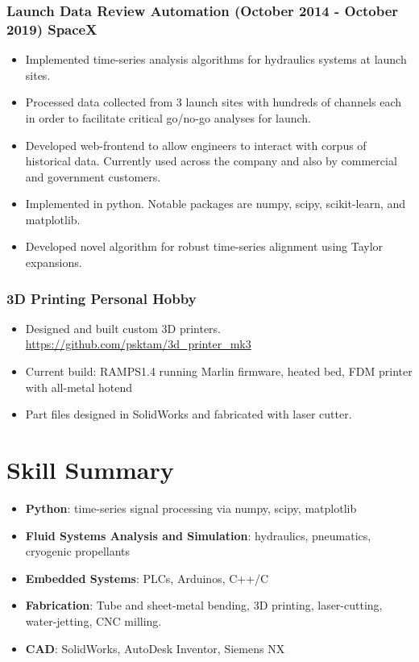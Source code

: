 \documentclass[11pt]{article}
\begin{document}
    \subsubsection*{Launch Data Review Automation
                    (October 2014 - October 2019) \hfill SpaceX}
        \begin{itemize}
            \setlength\itemsep{-0.5em}
            \item Implemented time-series analysis algorithms for hydraulics
                  systems at launch sites.
            \item Processed data collected from 3 launch sites with hundreds
                  of channels each in order to facilitate critical go/no-go
                  analyses for launch.
            \item Developed web-frontend to allow engineers to interact with
                  corpus of historical data. Currently used across the company
                  and also by commercial and government customers.
            \item Implemented in python. Notable packages are
                  numpy, scipy, scikit-learn, and matplotlib.
            \item Developed novel algorithm for robust time-series alignment 
                  using Taylor expansions.
        \end{itemize}

\subsubsection*{3D Printing \hfill Personal Hobby}
    \begin{itemize}
        \setlength\itemsep{-0.5em}
        \item  Designed and built custom 3D printers.
               \url{https://github.com/psktam/3d_printer_mk3}
        \item Current build: RAMPS1.4 running Marlin firmware, heated bed,
              FDM printer with all-metal hotend
        \item Part files designed in SolidWorks and fabricated with laser
              cutter.
    \end{itemize}

\section*{Skill Summary}
    \begin{itemize}
        \setlength\itemsep{-0.5em}
        \item \textbf{Python}: time-series signal processing via numpy, scipy,      
              matplotlib
        \item \textbf{Fluid Systems Analysis and Simulation}: hydraulics, pneumatics, 
              cryogenic propellants
        \item \textbf{Embedded Systems}: PLCs, Arduinos, C++/C
        \item \textbf{Fabrication}: Tube and sheet-metal bending, 
              3D printing, laser-cutting, water-jetting, CNC milling.
        \item \textbf{CAD}: SolidWorks, AutoDesk Inventor, Siemens NX
    \end{itemize}
\end{document}
